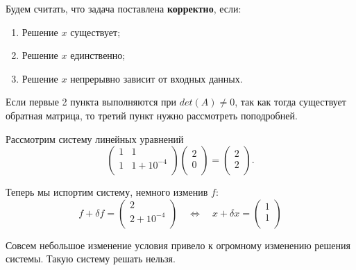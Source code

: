 \documentclass{article}
\begin{document}
\begin{define}
	Будем считать, что задача поставлена \textbf{корректно}, если:
	\begin{enumerate}[nosep]
		\item Решение $x$ существует;
		\item Решение $x$ единственно;
		\item Решение $x$ непрерывно зависит от входных данных.
	\end{enumerate}
\end{define}

Если первые 2 пункта выполняются при $det(A)\ne 0$, так как тогда существует
обратная матрица, то третий пункт нужно рассмотреть поподробней.

\begin{example}
	Рассмотрим систему линейных уравнений
	\[
		\begin{pmatrix}
			1	& 1 \\
			1	& 1+10^{-4} \\
		\end{pmatrix}
		\begin{pmatrix}
			2 \\
			0 \\
		\end{pmatrix}
		=
		\begin{pmatrix}
			2 \\
			2 \\
		\end{pmatrix}
		.
	\]

	Теперь мы испортим систему, немного изменив $f$:
	\[f+\delta f=
		\begin{pmatrix}
			2 \\
			2+10^{-4} \\
		\end{pmatrix}
		\quad\Leftrightarrow\quad
		x+\delta x=
		\begin{pmatrix}
			1 \\
			1 \\
		\end{pmatrix}
	\]

	Совсем небольшое изменение условия привело к огромному изменению
	решения системы. Такую систему решать нельзя.
\end{example}
\end{document}
